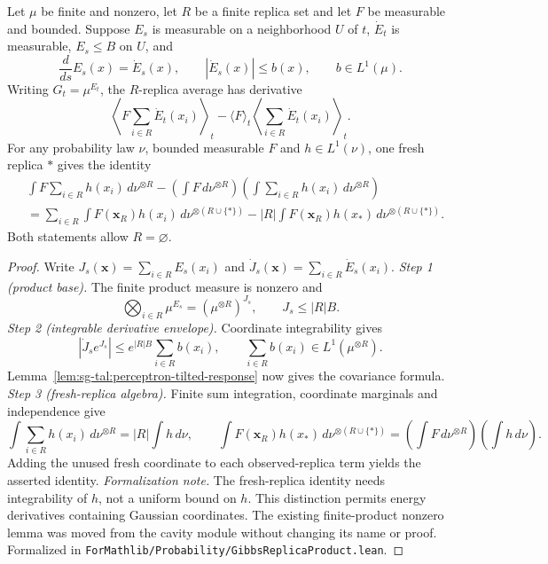 \begin{lemma}\label{lem:sg-tal:perceptron-replica-response}
  \leanok
Let $\mu$ be finite and nonzero, let $R$ be a finite replica set and let $F$ be measurable
and bounded. Suppose $E_s$ is measurable on a neighborhood $U$ of $t$,
$\dot E_t$ is measurable, $E_s\le B$ on $U$, and
\[
 \frac{d}{ds}E_s(x)=\dot E_s(x),\qquad |\dot E_s(x)|\le b(x),\qquad b\in L^1(\mu).
\]
Writing $G_t=\mu^{E_t}$, the $R$-replica average has derivative
\[
 \left\langle F\sum_{i\in R}\dot E_t(x_i)\right\rangle_t
 -\langle F\rangle_t\left\langle\sum_{i\in R}\dot E_t(x_i)\right\rangle_t.
\]
For any probability law $\nu$, bounded measurable $F$ and $h\in L^1(\nu)$, one fresh replica
$*$ gives the identity
\begin{align*}
 &\int F\sum_{i\in R}h(x_i)\,d\nu^{\otimes R}
 -\left(\int F\,d\nu^{\otimes R}\right)
  \left(\int\sum_{i\in R}h(x_i)\,d\nu^{\otimes R}\right)\\
 &=\sum_{i\in R}\int F(\mathbf x_R)h(x_i)\,d\nu^{\otimes(R\cup\{*\})}
   -|R|\int F(\mathbf x_R)h(x_*)\,d\nu^{\otimes(R\cup\{*\})}.
\end{align*}
Both statements allow $R=\varnothing$.
\end{lemma}
\begin{proof}
  \leanok
Write $J_s(\mathbf x)=\sum_{i\in R}E_s(x_i)$ and
$\dot J_s(\mathbf x)=\sum_{i\in R}\dot E_s(x_i)$.
\emph{Step 1 (product base).} The finite product measure is nonzero and
\[
 \bigotimes_{i\in R}\mu^{E_s}=(\mu^{\otimes R})^{J_s},\qquad
 J_s\le|R|B.
\]
\emph{Step 2 (integrable derivative envelope).} Coordinate integrability gives
\[
 |\dot J_s e^{J_s}|\le e^{|R|B}\sum_{i\in R}b(x_i),\qquad
 \sum_{i\in R}b(x_i)\in L^1(\mu^{\otimes R}).
\]
Lemma~\ref{lem:sg-tal:perceptron-tilted-response} now gives the covariance formula.
\emph{Step 3 (fresh-replica algebra).} Finite sum integration, coordinate marginals and
independence give
\[
 \int\sum_{i\in R}h(x_i)\,d\nu^{\otimes R}=|R|\int h\,d\nu,
 \qquad
 \int F(\mathbf x_R)h(x_*)\,d\nu^{\otimes(R\cup\{*\})}
 =\left(\int F\,d\nu^{\otimes R}\right)\left(\int h\,d\nu\right).
\]
Adding the unused fresh coordinate to each observed-replica term yields the asserted identity.
\emph{Formalization note.} The fresh-replica identity needs integrability of $h$, not a
uniform bound on $h$. This distinction permits energy derivatives containing Gaussian
coordinates. The existing finite-product nonzero lemma was moved from the cavity module
without changing its name or proof.
Formalized in \texttt{ForMathlib/Probability/GibbsReplicaProduct.lean}.
\end{proof}

